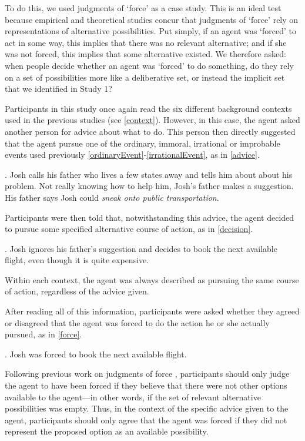 \documentclass[9pt,twocolumn,twoside]{pnas-new}
\begin{document}
To do this, we used judgments of `force' as a case study. This is an ideal test because empirical  \citep{phillips2009moral,young2011paradox} and theoretical \citep{berlin1970four,rowe2002nicomachean} studies concur that judgments of `force' rely on representations of alternative possibilities. Put simply, if an agent was `forced' to act in some way, this implies that there was no relevant alternative; and if she was not forced, this implies that some alternative existed. We therefore asked: when people decide whether an agent was `forced' to do something, do they rely on a set of possibilities more like a deliberative set, or instead the implicit set that we identified in Study 1?

Participants in this study once again read the six different background contexts used in the previous studies (see \ref{context}). However, in this case, the agent asked another person for advice about what to do. This person then directly suggested that the agent pursue one of the ordinary, immoral, irrational or improbable events used previously \ref{ordinaryEvent}-\ref{irrationalEvent}, as in \ref{advice}. 

\ex. \label{advice} Josh calls his father who lives a few states away and tells him about about his problem. Not really knowing how to help him, Josh's father makes a suggestion. His father says Josh could \textit{sneak onto public transportation}.

\noindent Participants were then told that, notwithstanding this advice, the agent decided to pursue some specified alternative course of action, as in \ref{decision}. 

\ex. \label{decision} Josh ignores his father’s suggestion and decides to book the next available flight, even though it is quite expensive.

Within each context, the agent was always described as pursuing the same course of action, regardless of the advice given.

After reading all of this information, participants were asked whether they agreed or disagreed that the agent was forced to do the action he or she actually pursued, as in \ref{force}.

\ex. \label{force} Josh was forced to book the next available flight.

Following previous work on judgments of force \citep{young2011paradox,rowe2002nicomachean,berlin1970four}, participants should only judge the agent to have been forced if they believe that there were not other options available to the agent---in other words, if the set of relevant alternative possibilities was empty. Thus, in the context of the specific advice given to the agent, participants should only agree that the agent was forced if they did not represent the proposed option as an available possibility.
\end{document}
